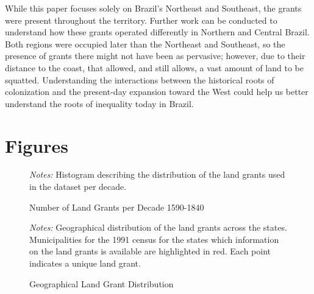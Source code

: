 \documentclass[11pt]{article}
\begin{document}
While this paper focuses solely on Brazil's Northeast and Southeast, the grants were present throughout the territory.
Further work can be conducted to understand how these grants operated differently in Northern and Central Brazil. 
Both regions were occupied later than the Northeast and Southeast, so the presence of grants there might not have been as pervasive; however, due to their distance to the coast, that allowed, and still allows, a vast amount of land to be squatted. 
Understanding the interactions between the historical roots of colonization and the present-day expansion toward the West could help us better understand the roots of inequality today in Brazil.


\clearpage


\printbibliography

\clearpage

\section*{Figures}

\begin{figure}[h!]
  \caption{Number of Land Grants per Decade 1590-1840}
  \begin{center}
  \end{center}
  \textit{Notes:} Histogram describing the distribution of the land grants used in the dataset per decade.  
  \label{fig:year_distribution}
\end{figure}

\begin{figure}[h!]
  \caption{Geographical Land Grant Distribution}
  \begin{center}
  \end{center}
  \textit{Notes:} Geographical distribution of the land grants across the states. Municipalities for the 1991 census for the states which information on the land grants is available are highlighted in red. Each point indicates a unique land grant. 
  \label{fig:land_grants_distribution}
\end{figure}
\end{document}
